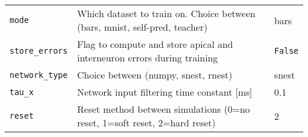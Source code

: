 \begin{table}
\begin{center}
\begin{tabular}{p{}p{}p{}}
      \texttt{mode}                & Which dataset to train on. Choice between (bars, mnist, self-pred, teacher) & bars
      \\
      \texttt{store\_errors}       & Flag to compute and store apical and interneuron errors during training     &
      \texttt{False}
      \\
      \texttt{network\_type}       & Choice between (numpy, snest, rnest)                                        & snest
      \\
      \texttt{tau\_x}              & Network input filtering time constant [ms]                                  & 0.1
      \\
      \texttt{reset}               & Reset method between simulations (0=no reset, 1=soft reset, 2=hard reset)   & 2              \\


\end{tabular}
\end{center}
\end{table}
